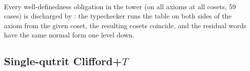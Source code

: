 \begin{code}%
\>[0]\AgdaSpace{}%
\AgdaSymbol{:}\AgdaSpace{}%
\<%
\\
\>[0][@{}l@{\AgdaIndent{0}}]%
\>[2]\AgdaSymbol{(}\AgdaSpace{}%
\AgdaSymbol{(}\AgdaSpace{}%
\AgdaOperator{\AgdaDatatype{\AgdaUnderscore{}===\AgdaUnderscore{}}}\AgdaSymbol{))}\AgdaSpace{}%
\AgdaSymbol{(}\AgdaSpace{}%
\AgdaSymbol{(}\AgdaSpace{}%
\AgdaSymbol{))}\AgdaSpace{}%
\AgdaSymbol{(}\AgdaSpace{}%
\AgdaSymbol{)}\<%
\end{code}
\begin{code}[hide]%
\>[0]\AgdaSpace{}%
\AgdaSymbol{=}\AgdaSpace{}%
\<%
\end{code}

Every well-definedness obligation in the tower (on all axioms at all
cosets, 59 cases) is discharged by
: the typechecker runs the table
on both sides of the axiom from the given coset, the resulting cosets
coincide, and the residual words have the same normal form one level
down.

\subsection{Single-qutrit Clifford+$T$}\label{sec:qutrit}


